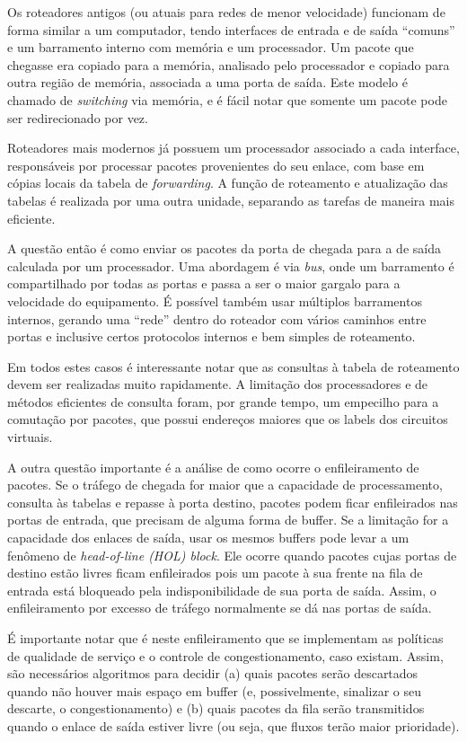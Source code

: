 Os roteadores antigos (ou atuais para redes de menor velocidade) funcionam de forma similar a um computador,
tendo interfaces de entrada e de saída ``comuns'' e um barramento interno com memória e um processador. 
Um pacote que chegasse era copiado para a memória, analisado pelo processador e copiado para outra região de memória, associada a uma porta de saída.
Este modelo é chamado de \emph{switching} via memória, e é fácil notar que somente um pacote pode ser redirecionado por vez.

Roteadores mais modernos já possuem um processador associado a cada interface, responsáveis por processar pacotes provenientes do seu enlace,
com base em cópias locais da tabela de \emph{forwarding}.
A função de roteamento e atualização das tabelas é realizada por uma outra unidade, separando as tarefas de maneira mais eficiente.

A questão então é como enviar os pacotes da porta de chegada para a de saída calculada por um processador.
Uma abordagem é via \emph{bus}, onde um barramento é compartilhado por todas as portas e passa a ser o maior gargalo para a velocidade do equipamento.
É possível também usar múltiplos barramentos internos, gerando uma ``rede'' dentro do roteador com vários caminhos entre portas e inclusive certos protocolos internos e bem simples de roteamento.

Em todos estes casos é interessante notar que as consultas à tabela de roteamento devem ser realizadas muito rapidamente.
A limitação dos processadores e de métodos eficientes de consulta foram, por grande tempo, um empecilho para a comutação por pacotes, 
que possui endereços maiores que os labels dos circuitos virtuais.

A outra questão importante é a análise de como ocorre o enfileiramento de pacotes.
Se o tráfego de chegada for maior que a capacidade de processamento, consulta às tabelas e repasse à porta destino, pacotes podem ficar enfileirados nas portas de entrada, que precisam de alguma forma de buffer.
Se a limitação for a capacidade dos enlaces de saída, usar os mesmos buffers pode levar a um fenômeno de \emph{head-of-line (HOL) block}.
Ele ocorre quando pacotes cujas portas de destino estão livres ficam enfileirados pois um pacote à sua frente na fila de entrada está bloqueado pela indisponibilidade de sua porta de saída.
Assim, o enfileiramento por excesso de tráfego normalmente se dá nas portas de saída.

É importante notar que é neste enfileiramento que se implementam as políticas de qualidade de serviço e o controle de congestionamento, caso existam.
Assim, são necessários algoritmos para decidir (a) quais pacotes serão descartados quando não houver mais espaço em buffer (e, possivelmente, sinalizar o seu descarte, o congestionamento) 
e (b) quais pacotes da fila serão transmitidos quando o enlace de saída estiver livre (ou seja, que fluxos terão maior prioridade).

